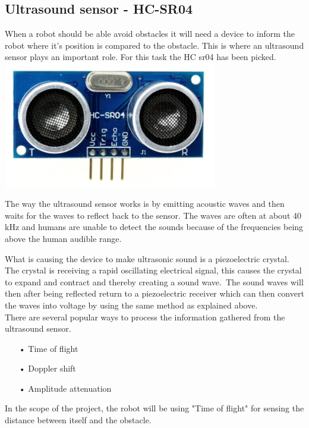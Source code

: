 \subsection{Ultrasound sensor - HC-SR04}
When a robot should be able avoid obstacles it will need a device to inform the robot where it's position is compared to the obstacle. This is where an ultrasound sensor plays an important role. For this task the HC sr04 has been picked.\\

\includegraphics[width=0.7\textwidth]{figures/hc04.jpg}

The way the ultrasound sensor works is by emitting acoustic waves and then waits for the waves to reflect back to the sensor. The waves are often at about 40 kHz and humans are unable to detect the sounds because of the frequencies being above the human audible range.\

What is causing the device to make ultrasonic sound is a piezoelectric crystal. The crystal is receiving a rapid oscillating electrical signal, this causes the crystal to expand and contract and thereby creating a sound wave.\ The sound waves will then after being reflected return to a piezoelectric receiver which can then convert the waves into voltage by using the same method as explained above. \\


There are several popular ways to process the information gathered from the ultrasound sensor. \\

\begin{enumerate}
	\item[•]Time of flight
	\item[•]Doppler shift
	\item[•]Amplitude attenuation
\end{enumerate}

In the scope of the project, the robot will be using "Time of flight" for sensing the distance between itself and the obstacle.\

